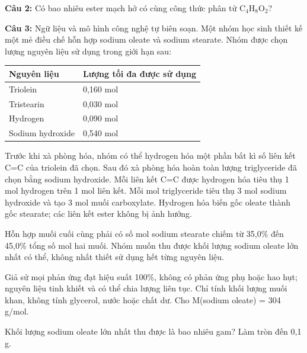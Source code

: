 \documentclass[12pt,a4paper]{article}
\begin{document}
\par\noindent\begin{minipage}{\linewidth}
\noindent \textbf{Câu 2:} Có bao nhiêu ester mạch hở có cùng công thức phân tử $\text{C}_4\text{H}_8\text{O}_2$?\\
\end{minipage}\par\vspace{0.12cm}

\par\noindent\begin{minipage}{\linewidth}
\noindent\textbf{Câu 3:} Ngữ liệu và mô hình công nghệ tự biên soạn. Một nhóm học sinh thiết kế một mẻ điều chế hỗn hợp sodium oleate và sodium stearate. Nhóm được chọn lượng nguyên liệu sử dụng trong giới hạn sau:\par
\begin{center}\small\begin{tabularx}{\linewidth}{|X|X|}
\hline
Nguyên liệu & Lượng tối đa được sử dụng \\ \hline
Triolein & 0,160 mol \\ \hline
Tristearin & 0,030 mol \\ \hline
Hydrogen & 0,090 mol \\ \hline
Sodium hydroxide & 0,540 mol \\ \hline
\end{tabularx}\end{center}
Trước khi xà phòng hóa, nhóm có thể hydrogen hóa một phần bất kì số liên kết C=C của triolein đã chọn. Sau đó xà phòng hóa hoàn toàn lượng triglyceride đã chọn bằng sodium hydroxide. Mỗi liên kết C=C được hydrogen hóa tiêu thụ 1 mol hydrogen trên 1 mol liên kết. Mỗi mol triglyceride tiêu thụ 3 mol sodium hydroxide và tạo 3 mol muối carboxylate. Hydrogen hóa biến gốc oleate thành gốc stearate; các liên kết ester không bị ảnh hưởng.\par
Hỗn hợp muối cuối cùng phải có số mol sodium stearate chiếm từ 35,0\% đến 45,0\% tổng số mol hai muối. Nhóm muốn thu được khối lượng sodium oleate lớn nhất có thể, không nhất thiết sử dụng hết từng nguyên liệu.\par
Giả sử mọi phản ứng đạt hiệu suất 100\%, không có phản ứng phụ hoặc hao hụt; nguyên liệu tinh khiết và có thể chia lượng liên tục. Chỉ tính khối lượng muối khan, không tính glycerol, nước hoặc chất dư. Cho M(sodium oleate) = 304 g/mol.\par
Khối lượng sodium oleate lớn nhất thu được là bao nhiêu gam? Làm tròn đến 0,1 g.\par
\end{minipage}\par\vspace{0.12cm}
\end{document}
